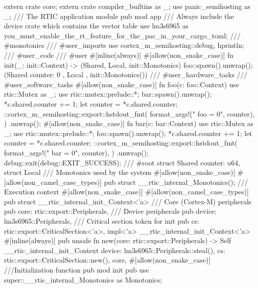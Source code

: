 extern crate core;
extern crate compiler_builtins as _;
use panic_semihosting as _;
/// The RTIC application module
pub mod app {
    /// Always include the device crate which contains the vector table
    use lm3s6965 as you_must_enable_the_rt_feature_for_the_pac_in_your_cargo_toml;
    /// #monotonics
    /// #user_imports
    use cortex_m_semihosting::{debug, hprintln};
    /// #user_code
    /// #user
    #[inline(always)]
    #[allow(non_snake_case)]
    fn init(_: init::Context) -> (Shared, Local, init::Monotonics) {
        foo::spawn().unwrap();
        (Shared { counter: 0 }, Local {}, init::Monotonics())
    }
    /// #user_hardware_tasks
    /// #user_software_tasks
    #[allow(non_snake_case)]
    fn foo(c: foo::Context) {
        use rtic::Mutex as _;
        use rtic::mutex::prelude::*;
        bar::spawn().unwrap();
        *c.shared.counter += 1;
        let counter = *c.shared.counter;
        ::cortex_m_semihosting::export::hstdout_fmt(
                format_args!("  foo = {0}\n", counter),
            )
            .unwrap();
    }
    #[allow(non_snake_case)]
    fn bar(c: bar::Context) {
        use rtic::Mutex as _;
        use rtic::mutex::prelude::*;
        foo::spawn().unwrap();
        *c.shared.counter += 1;
        let counter = *c.shared.counter;
        ::cortex_m_semihosting::export::hstdout_fmt(
                format_args!("  bar = {0}\n", counter),
            )
            .unwrap();
        debug::exit(debug::EXIT_SUCCESS);
    }
    /// #root
    struct Shared {
        counter: u64,
    }
    struct Local {}
    /// Monotonics used by the system
    #[allow(non_snake_case)]
    #[allow(non_camel_case_types)]
    pub struct __rtic_internal_Monotonics();
    /// Execution context
    #[allow(non_snake_case)]
    #[allow(non_camel_case_types)]
    pub struct __rtic_internal_init_Context<'a> {
        /// Core (Cortex-M) peripherals
        pub core: rtic::export::Peripherals,
        /// Device peripherals
        pub device: lm3s6965::Peripherals,
        /// Critical section token for init
        pub cs: rtic::export::CriticalSection<'a>,
    }
    impl<'a> __rtic_internal_init_Context<'a> {
        #[inline(always)]
        pub unsafe fn new(core: rtic::export::Peripherals) -> Self {
            __rtic_internal_init_Context {
                device: lm3s6965::Peripherals::steal(),
                cs: rtic::export::CriticalSection::new(),
                core,
            }
        }
    }
    #[allow(non_snake_case)]
    ///Initialization function
    pub mod init {
        pub use super::__rtic_internal_Monotonics as Monotonics;
}}
